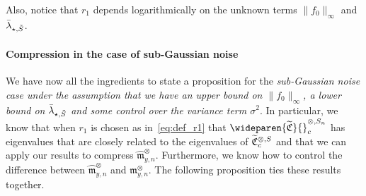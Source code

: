 \documentclass[10pt]{amsart}
\theoremstyle{definition}\newtheorem{defi}[theo]{Definition}\newtheorem{rema}[theo]{Remark}\newtheorem{exam}[theo]{Example}\newtheorem{exem}[theo]{Example}\newtheorem{nota}[theo]{Notation}
\theoremstyle{remark}
\newcommand{\fkC}{\mathfrak{C}}
\newcommand{\mean}{\mathfrak{m}}
\newcommand{\CovCapn}{\wideparen{\widetilde{\fkC}}{\vphantom{\fkC}}^{\otimes,S_n}_c}
\let\oldtilde\tilde
\renewcommand*{\tilde}[1]{\mathchoice{\widetilde{#1}}{\widetilde{#1}}{\oldtilde{#1}}{\oldtilde{#1}}}
\begin{document}
Also, notice that $r_1$ depends logarithmically on the unknown terms $\|f_0\|_\infty$ and~$\bar \lambda_{\star,\tilde S}$.


\paragraph{Compression in the case of sub-Gaussian noise} We have now all the ingredients to state a proposition for the \emph{sub-Gaussian noise case under the assumption that we have an upper bound on $\|f_0\|_\infty$, a lower bound on $\bar \lambda_{\star,\tilde S}$ and some control over the variance term $\sigma^2$}. In particular, we know that when $r_1$ is chosen as in~\eqref{eq:def_r1} that $\CovCapn$ has eigenvalues that are closely related to the eigenvalues of $\tilde{\fkC}^{\otimes,S}_c$ and that we can apply our results to compress $\wideparen{\mean}_{y,n}^\otimes$. Furthermore, we know how to control the difference between $\wideparen{\mean}_{y,n}^\otimes$ and $\mean_{y,n}^\otimes$. The following proposition ties these results together.
\end{document}
